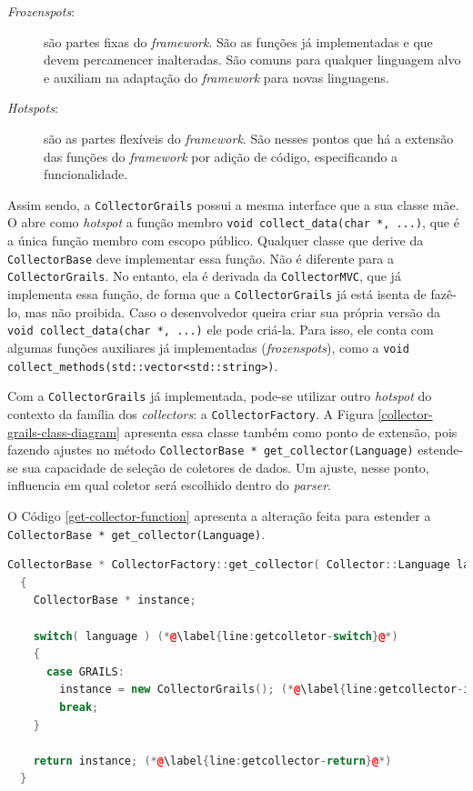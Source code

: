 \begin{description}
\item[\textit{Frozenspots}:] são partes fixas do \textit{framework}. São as funções já
implementadas e que devem percamencer inalteradas. São comuns para qualquer linguagem alvo e auxiliam na adaptação do \textit{framework} para novas linguagens.
\item[	\textit{Hotspots}:] são as partes flexíveis do \textit{framework}. São nesses
pontos que há a extensão das funções do \textit{framework} por adição de
código, especificando a funcionalidade.
\end{description}

Assim sendo, a \lstinline|CollectorGrails| possui a mesma interface que a
sua classe mãe. O \framework abre como \textit{hotspot} a função
membro \lstinline|void collect_data(char *, ...)|, que é a única função membro
com escopo público. Qualquer classe que derive da \lstinline|CollectorBase| deve
implementar essa função. Não é diferente para a \lstinline|CollectorGrails|. No
entanto, ela é derivada da \lstinline|CollectorMVC|, que já implementa essa
função, de forma que a \lstinline|CollectorGrails| já está isenta de fazê-lo, mas
não proibida. Caso o desenvolvedor queira criar sua própria versão da
\lstinline|void collect_data(char *, ...)| ele pode criá-la. Para isso, ele conta
com algumas funções auxiliares já implementadas (\textit{frozenspots}), como a
\lstinline|void collect_methods(std::vector<std::string>)|.

Com a \lstinline|CollectorGrails| já implementada, pode-se utilizar outro
\textit{hotspot} do contexto da família dos \textit{collectors}: a
\lstinline|CollectorFactory|. A Figura \ref{collector-grails-class-diagram}
apresenta essa classe também como ponto de extensão, pois fazendo ajustes no
método \lstinline|CollectorBase * get_collector(Language)| estende-se sua
capacidade de seleção de coletores de dados. Um ajuste, nesse ponto, influencia
em qual coletor será escolhido dentro do \textit{parser}.

O Código \ref{get-collector-function} apresenta a alteração feita para estender
a \lstinline|CollectorBase * get_collector(Language)|.

\begin{lstlisting}[language=C++, label=get-collector-function, caption=Implementação e extensão da \lstinline{get_collector(Language)}]
CollectorBase * CollectorFactory::get_collector( Collector::Language language ) (*@\label{line:getcolletor-language}@*)
  {
    CollectorBase * instance;

    switch( language ) (*@\label{line:getcolletor-switch}@*)
    {
      case GRAILS:
        instance = new CollectorGrails(); (*@\label{line:getcollector-instancegrails}@*)
        break;
    }

    return instance; (*@\label{line:getcollector-return}@*)
  }
\end{lstlisting}

